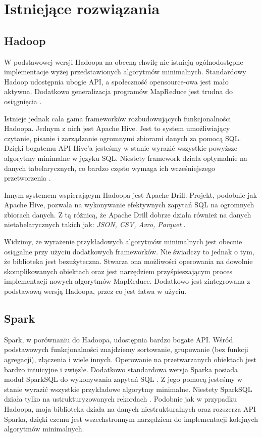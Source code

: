 \documentclass{pracamgr}
\begin{document}
\chapter{Istniejące rozwiązania}

\section{Hadoop}

W podstawowej wersji Hadoopa na obecną chwilę nie istnieją ogólnodostępne implementacje wyżej przedstawionych algorytmów minimalnych. Standardowy Hadoop udostępnia ubogie API, a społeczność opensource-owa jest mało aktywna.   Dodatkowo generalizacja programów MapReduce jest trudna do osiągnięcia \cite{shvachko2010hadoop, white2012hadoop, taylor2010overview}.

Istnieje jednak cała gama frameworków rozbudowujących funkcjonalności Hadoopa. Jednym z nich jest Apache Hive. Jest to system umożliwiający czytanie, pisanie i zarządzanie ogromnymi zbiorami danych za pomocą SQL. Dzięki bogatemu API Hive'a jesteśmy w stanie wyrazić wszystkie powyższe algorytmy minimalne w języku SQL. Niestety framework działa optymalnie na danych tabelarycznych, co bardzo często wymaga ich wcześniejszego przetworzenia \cite{Huai:2014:MTA:2588555.2595630} .

Innym systemem wspierającym Hadoopa jest Apache Drill. Projekt, podobnie jak Apache Hive, pozwala na wykonywanie efektywnych zapytań SQL na ogromnych zbiorach danych. Z tą różnicą, że Apache Drill dobrze działa również na danych nietabelarycznych takich jak: \textit{JSON, CSV, Avro, Parquet} \cite{apache_drill}.

Widzimy, że wyrażenie przykładowych algorytmów minimalnych jest obecnie osiągalne przy użyciu dodatkowych frameworków. Nie świadczy to jednak o tym, że biblioteka jest bezużyteczna. Stwarza ona możliwości operowania na dowolnie skomplikowanych obiektach oraz jest narzędziem przyśpieszającym proces implementacji nowych algorytmów MapReduce. Dodatkowo jest zintegrowana z podstawową wersją Hadoopa, przez co jest łatwa w użyciu.

\section{Spark}

Spark, w porównaniu do Hadoopa, udostępnia bardzo bogate API. Wśród podstawowych funkcjonalności znajdziemy sortowanie, grupowanie (bez funkcji agregacji), złączenia i wiele innych. Operowanie na przetwarzanych obiektach jest bardzo intuicyjne i zwięzłe. Dodatkowo standardowa wersja Sparka posiada moduł SparkSQL do wykonywania zapytań SQL \cite{zaharia2010spark}. Z jego pomocą jesteśmy w stanie wyrazić wszystkie przykładowe algorytmy minimalne. Niestety SparkSQL działa tylko na ustrukturyzowanych rekordach \cite{Armbrust:2015:SSR:2723372.2742797}. Podobnie jak w przypadku Hadoopa, moja biblioteka działa na danych niestrukturalnych oraz rozszerza API Sparka, dzięki czemu jest wszechstronnym narzędziem do implementacji kolejnych algorytmów minimalnych.
\end{document}
